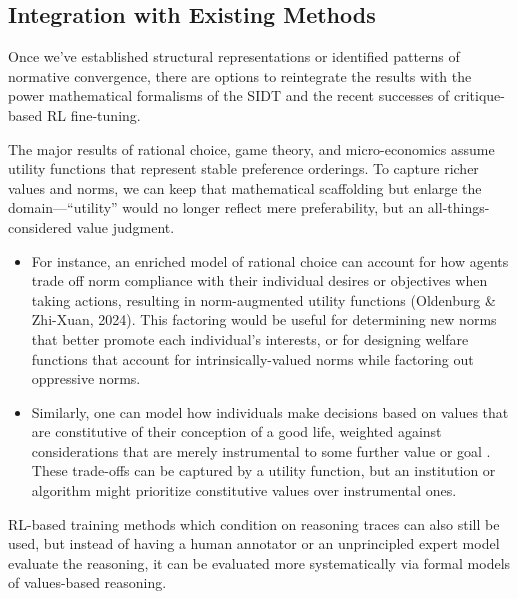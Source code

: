 \subsection{Integration with Existing Methods}

Once we've established structural representations or identified patterns of normative convergence, there are options to reintegrate the results with the power mathematical formalisms of the SIDT and the recent successes of critique-based RL fine-tuning.

The major results of rational choice, game theory, and micro-economics assume utility functions that represent stable preference orderings. To capture richer values and norms, we can keep that mathematical scaffolding but enlarge the domain—``utility'' would no longer reflect mere preferability, but an all-things-considered value judgment.

\begin{itemize}
\item For instance, an enriched model of rational choice can account for how agents trade off norm compliance with their individual desires or objectives when taking actions, resulting in norm-augmented utility functions (Oldenburg \& Zhi-Xuan, 2024). This factoring would be useful for determining new norms that better promote each individual's interests, or for designing welfare functions that account for intrinsically-valued norms while factoring out oppressive norms.

\item Similarly, one can model how individuals make decisions based on values that are constitutive of their conception of a good life, weighted against considerations that are merely instrumental to some further value or goal \cite{edelman2022}. These trade-offs can be captured by a utility function, but an institution or algorithm might prioritize constitutive values over instrumental ones.
\end{itemize}

RL-based training methods which condition on reasoning traces can also still be used, but instead of having a human annotator or an unprincipled expert model evaluate the reasoning, it can be evaluated more systematically via formal models of values-based reasoning.